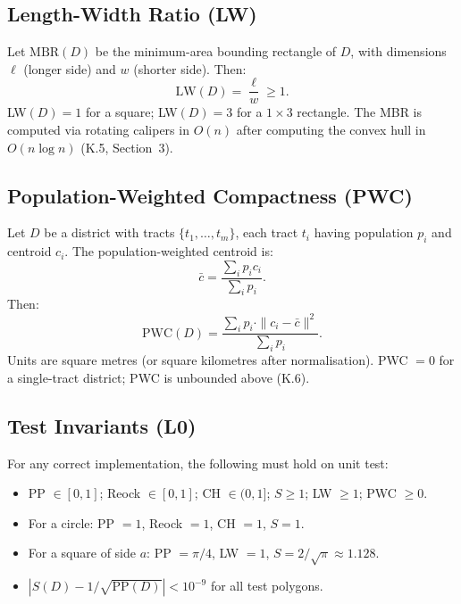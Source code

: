 \subsection{Length-Width Ratio (LW)}

Let $\text{MBR}(D)$ be the minimum-area bounding rectangle of $D$, with dimensions
$\ell$ (longer side) and $w$ (shorter side). Then:
\[
  \text{LW}(D) = \frac{\ell}{w} \geq 1.
\]
LW$(D) = 1$ for a square; LW$(D) = 3$ for a $1\times 3$ rectangle.
The MBR is computed via rotating calipers in $O(n)$ after computing the convex hull
in $O(n \log n)$ (K.5, Section~3).

\subsection{Population-Weighted Compactness (PWC)}

Let $D$ be a district with tracts $\{t_1, \ldots, t_m\}$, each tract $t_i$ having
population $p_i$ and centroid $c_i$. The population-weighted centroid is:
\[
  \bar{c} = \frac{\sum_i p_i c_i}{\sum_i p_i}.
\]
Then:
\[
  \text{PWC}(D) = \frac{\sum_i p_i \cdot \|c_i - \bar{c}\|^2}{\sum_i p_i}.
\]
Units are square metres (or square kilometres after normalisation).
PWC $= 0$ for a single-tract district; PWC is unbounded above (K.6).

\subsection{Test Invariants (L0)}

For any correct implementation, the following must hold on unit test:
\begin{itemize}
  \item PP $\in [0,1]$; Reock $\in [0,1]$; CH $\in (0,1]$;
    $S \geq 1$; LW $\geq 1$; PWC $\geq 0$.
  \item For a circle: PP $= 1$, Reock $= 1$, CH $= 1$, $S = 1$.
  \item For a square of side $a$: PP $= \pi/4$, LW $= 1$,
    $S = 2/\sqrt{\pi} \approx 1.128$.
  \item $|S(D) - 1/\sqrt{\text{PP}(D)}| < 10^{-9}$ for all test polygons.
\end{itemize}

